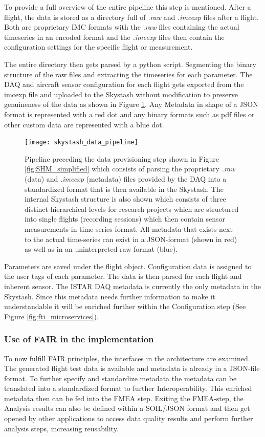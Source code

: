 To provide a full overview of the entire pipeline this step is mentioned. After a flight, the data is stored as a directory full of \textit{.raw} and \textit{.imcexp} files after a flight. Both are proprietary IMC formats with the \textit{.raw} files containing the actual timeseries in an encoded format and the \textit{.imcexp} files then contain the configuration settings for the specific flight or measurement.

The entire directory then gets parsed by a python script. Segmenting the binary structure of the raw files and extracting the timeseries for each parameter. The DAQ and aircraft sensor configuration for each flight gets exported from the imcexp file and uploaded to the Skystash without modification to preserve genuineness of the data as shown in Figure \ref{fig:skystash_data_pipeline}. Any Metadata in shape of a JSON format is represented with a red dot and any binary formats such as pdf files or other custom data are represented with a blue dot.

\begin{figure}
    \centering
    \texttt{[image: skystash\_data\_pipeline]}
    \caption[FTI-Microservices: Data Provision]{Pipeline preceding the data provisioning step shown in Figure \ref{fig:SHM_simplified} which consists of parsing the proprietary \textit{.raw} (data) and \textit{.imcexp} (metadata) files provided by the DAQ into a standardized format that is then available in the Skystash. The internal Skystash structure is also shown which consists of three distinct hierarchical levels for research projects which are structured into single flights (recording sessions) which then contain sensor measurements in time-series format. All metadata that exists next to the actual time-series can exist in a JSON-format (shown in red) as well as in an uninterpreted raw format (blue).}
    \label{fig:skystash_data_pipeline}
\end{figure}

Parameters are saved under the flight object. Configuration data is assigned to the user tags of each parameter. The data is then parsed for each flight and inherent sensor. The ISTAR DAQ metadata is currently the only metadata in the Skystash. Since this metadata needs further information to make it understandable it will be enriched further within the Configuration step (See Figure \ref{fig:fti_microservices}).

\subsubsection{Use of FAIR in the implementation}
To now fulfill FAIR principles, the interfaces in the architecture are examined. The generated flight test data is available and metadata is already in a JSON-file format. To further specify and standardize metadata the metadata can be translated into a standardized format to further Interoperability. This enriched metadata then can be fed into the FMEA step. Exiting the FMEA-step, the Analysis results can also be defined within a SOIL/JSON format and then get opened by other applications to access data quality results and perform further analysis steps, increasing reusability.

